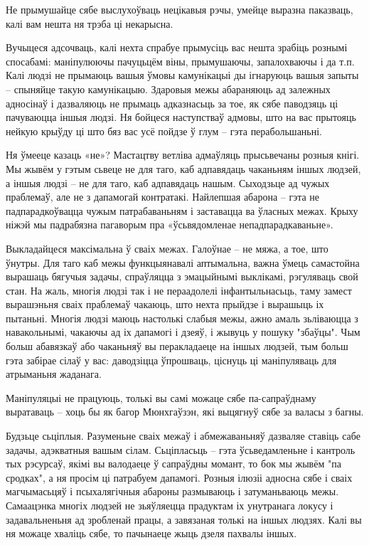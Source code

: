 Не прымушайце сябе выслухоўваць нецікавыя рэчы, умейце выразна паказваць, калі вам нешта ня трэба ці некарысна.

Вучыцеся адсочваць, калі нехта спрабуе прымусіць вас нешта зрабіць рознымі спосабамі: маніпулюючы пачуцьцём віны, прымушаючы, запалохваючы і да т.п. Калі людзі не прымаюць вашыя ўмовы камунікацыі ды ігнаруюць вашыя запыты – спыняйце такую камунікацыю. Здаровыя межы абараняюць ад залежных адносінаў і дазваляюць не прымаць адказнасьць за тое, як сябе паводзяць ці пачуваюцца іншыя людзі. Ня бойцеся наступстваў адмовы, што на вас прытояць нейкую крыўду ці што бяз вас усё пойдзе ў глум – гэта перабольшаньні.

Ня ўмееце казаць «не»? Мастацтву ветліва адмаўляць прысьвечаны розныя кнігі. Мы жывём у гэтым сьвеце не для таго, каб адпавядаць чаканьням іншых людзей, а іншыя людзі – не для таго, каб адпавядаць нашым. Сыходзьце ад чужых праблемаў, але не з дапамогай контратакі. Найлепшая абарона – гэта не падпарадкоўвацца чужым патрабаваньням і заставацца ва ўласных межах. Крыху ніжэй мы падрабязна пагаворым пра «ўсьвядомленае непадпарадкаваньне».

Выкладайцеся максімальна ў сваіх межах. Галоўнае – не мяжа, а тое, што ўнутры. Для таго каб межы функцыянавалі аптымальна, важна ўмець самастойна вырашаць бягучыя задачы, спраўляцца з эмацыйнымі выклікамі, рэгуляваць свой стан. На жаль, многія людзі так і не пераадолелі інфантыльнасьць, таму замест вырашэньня сваіх праблемаў чакаюць, што нехта прыйдзе і вырашыць іх пытаньні. Многія людзі маюць настолькі слабыя межы, ажно амаль зьліваюцца з навакольнымі, чакаючы ад іх дапамогі і дзеяў, і жывуць у пошуку "збаўцы". Чым больш абавязкаў або чаканьняў вы перакладаеце на іншых людзей, тым больш гэта забірае сілаў у вас: даводзіцца ўпрошваць, ціснуць ці маніпуляваць для атрыманьня жаданага.

Маніпуляцыі не працуюць, толькі вы самі можаце сябе па-сапраўднаму выратаваць – хоць бы як багор Мюнхгаўзэн, які выцягнуў сябе за валасы з багны.

Будзьце сьціплыя. Разуменьне сваіх межаў і абмежаваньняў дазваляе ставіць сабе задачы, адэкватныя вашым сілам. Сьціпласьць – гэта ўсьведамленьне і кантроль тых рэсурсаў, якімі вы валодаеце ў сапраўдны момант, то бок мы жывём "па сродках", а ня просім ці патрабуем дапамогі. Розныя ілюзіі адносна сябе і сваіх магчымасьцяў і псыхалягічныя абароны размываюць і затуманьваюць межы. Самаацэнка многіх людзей не зьяўляецца прадуктам іх унутранага локусу і задавальненьня ад зробленай працы, а завязаная толькі на іншых людзях. Калі вы ня можаце хваліць сябе, то пачынаеце жыць дзеля пахвалы іншых. 


